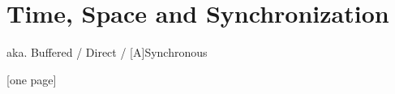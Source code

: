 \documentclass{acm_proc_article-sp}
\begin{document}

\section{Time, Space and Synchronization}

aka. Buffered / Direct / [A]Synchronous

[one page]

% 
% 
% 
% 
% 
%
% 
%
%
% 
% 
% 
% 
% 
% 
% 
\end{document}
